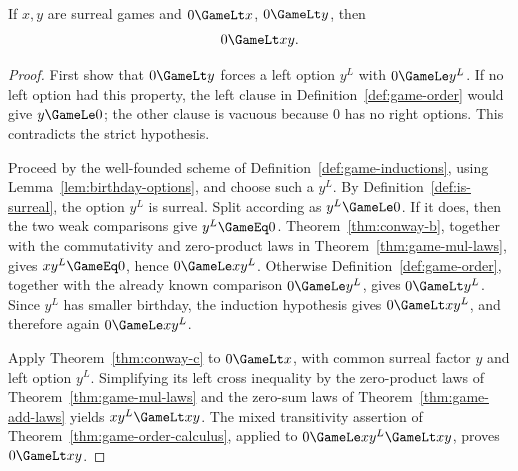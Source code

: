 \begin{theorem}
  \label{thm:game-mul-pos}
  \leanok
  If \(x,y\) are surreal games and \(0\GameLt x\), \(0\GameLt y\), then
  \[
    0\GameLt xy.
  \]
\end{theorem}
\begin{proof}
  \leanok
  First show that \(0\GameLt y\) forces a left option \(y^L\) with
  \(0\GameLe y^L\).  If no left option had this property, the left clause in
  Definition~\ref{def:game-order} would give \(y\GameLe0\); the other clause
  is vacuous because \(0\) has no right options.  This contradicts the strict
  hypothesis.

  Proceed by the well-founded scheme of
  Definition~\ref{def:game-inductions}, using
  Lemma~\ref{lem:birthday-options}, and choose such a \(y^L\).  By
  Definition~\ref{def:is-surreal}, the option \(y^L\) is surreal.  Split according as
  \(y^L\GameLe0\).  If it does, then the two weak comparisons give
  \(y^L\GameEq0\).  Theorem~\ref{thm:conway-b}, together with the
  commutativity and zero-product laws in Theorem~\ref{thm:game-mul-laws}, gives
  \(xy^L\GameEq0\), hence \(0\GameLe xy^L\).  Otherwise
  Definition~\ref{def:game-order}, together with the already known comparison
  \(0\GameLe y^L\), gives \(0\GameLt y^L\).  Since \(y^L\) has smaller birthday, the induction
  hypothesis gives \(0\GameLt xy^L\), and therefore again
  \(0\GameLe xy^L\).

  Apply Theorem~\ref{thm:conway-c} to \(0\GameLt x\), with common surreal
  factor \(y\) and left option \(y^L\).  Simplifying its left cross inequality
  by the zero-product laws of Theorem~\ref{thm:game-mul-laws} and the zero-sum
  laws of Theorem~\ref{thm:game-add-laws} yields
  \(xy^L\GameLt xy\).  The mixed transitivity assertion of
  Theorem~\ref{thm:game-order-calculus}, applied to
  \(0\GameLe xy^L\GameLt xy\), proves \(0\GameLt xy\).
\end{proof}

